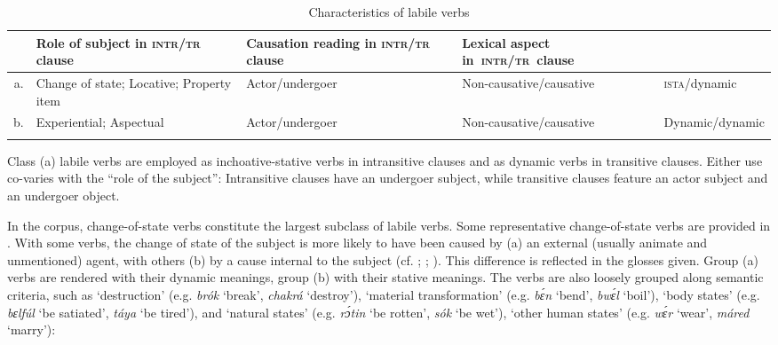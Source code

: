 \begin{table}
\caption{Characteristics of labile verbs}
\label{tab:key:9.5}
\small
\begin{tabularx}{\textwidth}{r>{\raggedright}p{24mm}p{24mm}p{29mm}Q}
\lsptoprule

 & Role of subject in \textsc{intr/tr} clause & Causation reading in \textsc{intr/tr} clause & Lexical aspect \mbox{in \textsc{intr/tr} clause}\\
\midrule
a. & Change of state; Locative; Property item& Actor/undergoer & Non-causative/causative & \textsc{ista}/dynamic\\


\tablevspace
b. & Experiential; Aspectual & Actor/undergoer & Non-causative/causative & Dynamic/dynamic\\
\lspbottomrule
\end{tabularx}
\end{table}
Class (a) labile verbs are employed as inchoative-stative verbs in intransitive clauses and as dynamic verbs in transitive clauses. Either use co-varies with the “role of the subject”: Intransitive clauses have an undergoer subject, while transitive clauses feature an actor subject and an undergoer object. 


In the corpus, change-of-state verbs constitute the largest subclass of labile verbs. Some representative change-of-state verbs are provided in . With some verbs, the change of state of the subject is more likely to have been caused by (a) an external (usually animate and unmentioned) agent{\fff}, with others (b) by a cause internal to the subject (cf. \citealt{Croft1990}; \citealt{Haspelmath1993}; \citealt{LevinHovav1995}). This difference is reflected in the glosses given. Group (a) verbs are rendered with their dynamic meanings, group (b) with their stative meanings. The verbs are also loosely grouped along semantic criteria, such as ‘destruction’ (e.g. \textit{brók} ‘break’, \textit{chakrá} ‘destroy’), ‘material transformation’ (e.g. \textit{bɛ́n} ‘bend’, \textit{bwɛ́l} ‘boil’), ‘body state{\fff}s’ (e.g. \textit{bɛlfúl} ‘be satiated’, \textit{táya} ‘be tired’), and ‘natural states’ (e.g. \textit{rɔ́tin} ‘be rotten’, \textit{sók} ‘be wet’), ‘other human states’ (e.g. \textit{wɛ́r} ‘wear’, \textit{máred} ‘marry’):


